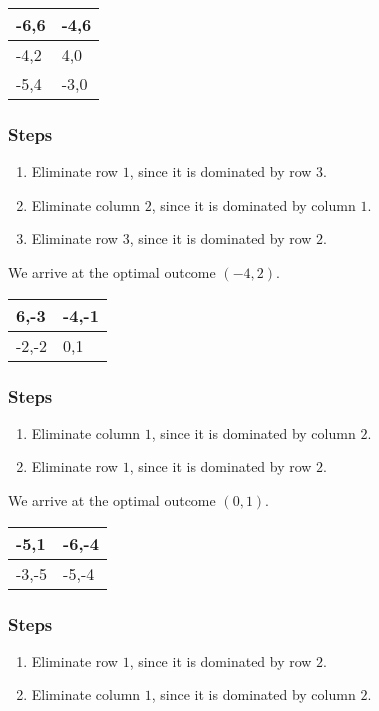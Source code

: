 \documentclass{article}
\begin{document}
\newpage
\begin{table}[]
\centering
\begin{tabular}{|l|l|}
\hline-6,6 & -4,6\\ \hline
-4,2 & 4,0\\ \hline
-5,4 & -3,0\\ \hline
\end{tabular}
\end{table}\subsubsection*{Steps}
\begin{enumerate}
\item Eliminate row $1$, since it is dominated by row $3$.
\item Eliminate column $2$, since it is dominated by column $1$.
\item Eliminate row $3$, since it is dominated by row $2$.
\end{enumerate}
We arrive at the optimal outcome $(-4, 2)$.
\newpage
\begin{table}[]
\centering
\begin{tabular}{|l|l|}
\hline6,-3 & -4,-1\\ \hline
-2,-2 & 0,1\\ \hline
\end{tabular}
\end{table}\subsubsection*{Steps}
\begin{enumerate}
\item Eliminate column $1$, since it is dominated by column $2$.
\item Eliminate row $1$, since it is dominated by row $2$.
\end{enumerate}
We arrive at the optimal outcome $(0, 1)$.
\newpage
\begin{table}[]
\centering
\begin{tabular}{|l|l|}
\hline-5,1 & -6,-4\\ \hline
-3,-5 & -5,-4\\ \hline
\end{tabular}
\end{table}\subsubsection*{Steps}
\begin{enumerate}
\item Eliminate row $1$, since it is dominated by row $2$.
\item Eliminate column $1$, since it is dominated by column $2$.
\end{enumerate}
\end{document}
